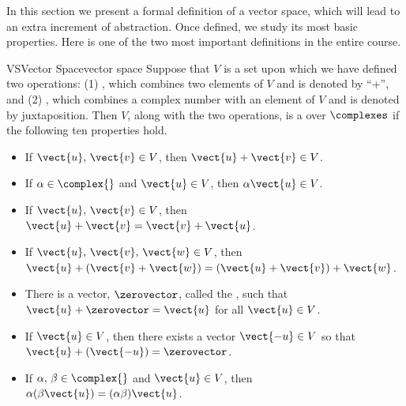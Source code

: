 %
In this section we present a formal definition of a vector space, which will lead to an extra increment of abstraction.  Once defined, we study its most basic properties.
%
%
Here is one of the two most important definitions in the entire course.
%
\begin{definition}{VS}{Vector Space}{vector space}
%
Suppose that $V$ is a set upon which we have defined two operations: (1) , which combines two elements of $V$ and is denoted by ``+'', and (2) , which combines a complex number with an element of $V$ and is denoted by juxtaposition.   Then $V$, along with the two operations, is a  over $\complexes$ if the following ten properties hold.
%
\begin{itemize}
%
\item{}
If $\vect{u},\,\vect{v}\in V$, then $\vect{u}+\vect{v}\in V$.
%
\item{}
If $\alpha\in\complex{\null}$ and $\vect{u}\in V$, then $\alpha\vect{u}\in V$.
%
\item{}
If $\vect{u},\,\vect{v}\in V$, then $\vect{u}+\vect{v}=\vect{v}+\vect{u}$.
%
\item{}
If $\vect{u},\,\vect{v},\,\vect{w}\in V$, then $\vect{u}+\left(\vect{v}+\vect{w}\right)=\left(\vect{u}+\vect{v}\right)+\vect{w}$.
%
\item{}
There is a vector, $\zerovector$, called the , such that  $\vect{u}+\zerovector=\vect{u}$  for all $\vect{u}\in V$.
%
\item{}
If $\vect{u}\in V$, then there exists a vector $\vect{-u}\in V$ so that $\vect{u}+ (\vect{-u})=\zerovector$.
%
\item{}
If $\alpha,\,\beta\in\complex{\null}$ and $\vect{u}\in V$, then $\alpha(\beta\vect{u})=(\alpha\beta)\vect{u}$.

\end{itemize}
\end{definition}
